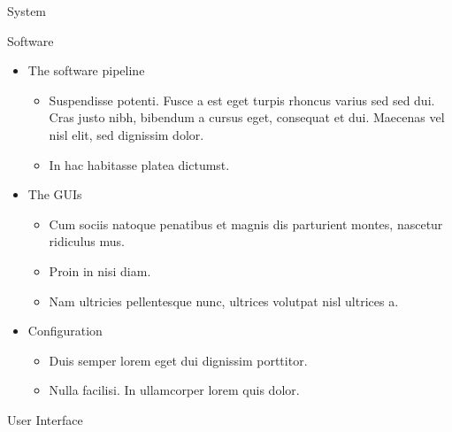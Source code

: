 \documentclass[final,hyperref={pdfpagelabels=false}]{beamer}
\begin{document}
\begin{frame}[t]
\begin{columns}[t]
\begin{column}{.465\textwidth}
\begin{block}{System}
\end{block}


\begin{block}{Software}

\begin{itemize}
\item The software pipeline
\begin{itemize}
\item Suspendisse potenti. Fusce a est eget turpis rhoncus varius sed sed dui. Cras justo nibh, bibendum a cursus eget, consequat et dui. Maecenas vel nisl elit, sed dignissim dolor. 
\item In hac habitasse platea dictumst.
\end{itemize}

\item The GUIs
\begin{itemize}
\item Cum sociis natoque penatibus et magnis dis parturient montes, nascetur ridiculus mus. 
\item Proin in nisi diam.
\item Nam ultricies pellentesque nunc, ultrices volutpat nisl ultrices a.
\end{itemize}

\item Configuration 
\begin{itemize}
\item Duis semper lorem eget dui dignissim porttitor.
\item Nulla facilisi. In ullamcorper lorem quis dolor.
\end{itemize}
\end{itemize}

\end{block}


\begin{block}{User Interface}


\end{block}
\end{column}
\end{columns}
\end{frame}
\end{document}
